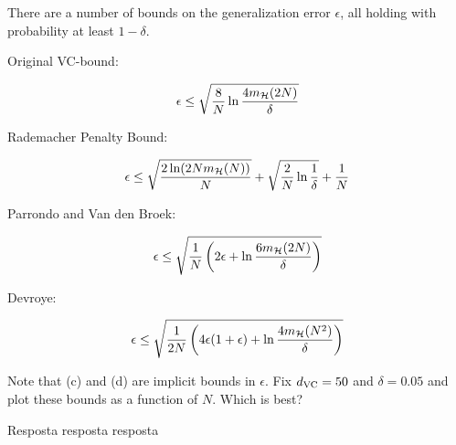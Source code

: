 \begin{enunciado}{20}
    There are a number of bounds on the generalization error $\epsilon$, all holding with probability at least $1 - \delta$.
    
     Original VC-bound:
    
    $$ \epsilon \le \sqrt{\frac{8}{N}\ln\frac{4m_{\mathcal{H}}(2N)}{\delta}} $$
    
     Rademacher Penalty Bound:
    
    $$ \epsilon \le \sqrt{\frac{2\ln(2Nm_{\mathcal{H}}(N))}{N}} + 
    \sqrt{\frac{2}{N}\ln\frac{1}{\delta}} + \frac{1}{N}$$
    
     Parrondo and Van den Broek:
    
    $$ \epsilon \le \sqrt{\frac{1}{N} \left( 2 \epsilon + \ln\frac{6m_{\mathcal{H}}(2N)}{\delta} \right)} $$
    
     Devroye:
    
    $$ \epsilon \le \sqrt{\frac{1}{2N} \left( 4 \epsilon(1+\epsilon) + \ln\frac{4m_{\mathcal{H}}(N^2)}{\delta} \right) } $$
    
    Note that (c) and (d) are implicit bounds in $\epsilon$. Fix $d_{\text{VC}} = 50$ and $\delta = 0.05$ and plot these bounds as a function of $N$. Which is best?
\end{enunciado}

Resposta resposta resposta